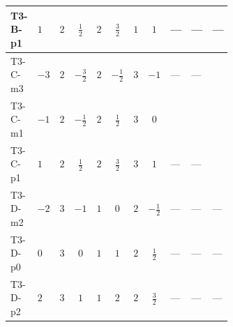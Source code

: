 \documentclass[8pt]{article}
\begin{document}
\begin{landscape}
\begin{longtable}{@{}llcccccc >{\raggedright\arraybackslash}p{0.21\linewidth} >{\raggedright\arraybackslash}p{0.21\linewidth} >{\raggedright\arraybackslash}p{0.21\linewidth}@{}}
\midrule
T3-B-p1 & $1$ & $2$ & $\frac{1}{2}$ & $2$ & $\frac{3}{2}$ & $1$ & $1$ & --- & --- & --- \\
\midrule
T3-C-m3 & $-3$ & $2$ & $-\frac{3}{2}$ & $2$ & $-\frac{1}{2}$ & $3$ & $-1$ & --- & --- & \scriptsize\adjustbox{max width=\linewidth}{$\begin{gathered} {\lambda_{HS_1}^{(1)}} (3 T_{\nu}^{(1)}+6 \operatorname{Tr}\!\left({Y_d}\,\left({Y_d}\right)^{\dagger}\right)+2 \operatorname{Tr}\!\left({Y_e}\,\left({Y_e}\right)^{\dagger}\right)+6 \operatorname{Tr}\!\left({Y_u}\,\left({Y_u}\right)^{\dagger}\right))\end{gathered}$} \\
\midrule
T3-C-m1 & $-1$ & $2$ & $-\frac{1}{2}$ & $2$ & $\frac{1}{2}$ & $3$ & $0$ & \scriptsize\adjustbox{max width=\linewidth}{$\begin{gathered} +24 {\lambda_{7}} \left({\lambda_{7}}\right)^{*}\end{gathered}$} & \scriptsize\adjustbox{max width=\linewidth}{$\begin{gathered} +3 {\lambda_{11}} \left({\lambda_{H H^\dagger S_1^\dagger S_2^\dagger}^{\rm Cross}}\right)^{*}\end{gathered}$} & \scriptsize\adjustbox{max width=\linewidth}{$\begin{gathered} {\lambda_{HS_1}^{(1)}} (3 T_{\nu}^{(1)}+6 \operatorname{Tr}\!\left({Y_d}\,\left({Y_d}\right)^{\dagger}\right)+2 \operatorname{Tr}\!\left({Y_e}\,\left({Y_e}\right)^{\dagger}\right)+6 \operatorname{Tr}\!\left({Y_u}\,\left({Y_u}\right)^{\dagger}\right))\end{gathered}$} \\
\midrule
T3-C-p1 & $1$ & $2$ & $\frac{1}{2}$ & $2$ & $\frac{3}{2}$ & $3$ & $1$ & --- & --- & \scriptsize\adjustbox{max width=\linewidth}{$\begin{gathered} {\lambda_{HS_1}^{(1)}} (3 T_{\nu}^{(1)}+6 \operatorname{Tr}\!\left({Y_d}\,\left({Y_d}\right)^{\dagger}\right)+2 \operatorname{Tr}\!\left({Y_e}\,\left({Y_e}\right)^{\dagger}\right)+6 \operatorname{Tr}\!\left({Y_u}\,\left({Y_u}\right)^{\dagger}\right))\end{gathered}$} \\
\midrule
T3-D-m2 & $-2$ & $3$ & $-1$ & $1$ & $0$ & $2$ & $-\frac{1}{2}$ & --- & --- & --- \\
\midrule
T3-D-p0 & $0$ & $3$ & $0$ & $1$ & $1$ & $2$ & $\frac{1}{2}$ & --- & --- & --- \\
\midrule
T3-D-p2 & $2$ & $3$ & $1$ & $1$ & $2$ & $2$ & $\frac{3}{2}$ & --- & --- & --- \\

\end{longtable}
\end{landscape}
\end{document}
